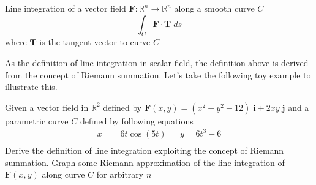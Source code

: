 \documentclass[../../main.tex]{subfiles}
\begin{document}
	
		\begin{definition}\label{def: scalar line integration}
		Line integration of a vector field $\mathbf{F}: \mathbb{R}^n \rightarrow \mathbb{R}^n$ along a smooth curve $C$
		\begin{equation}
			\int_C \mathbf{F} \cdot \mathbf{T} \; ds
		\end{equation}
		where $\mathbf{T}$ is the tangent vector to curve $C$
	\end{definition}
		
	\par As the definition of line integration in scalar field, the definition above is derived from the concept of Riemann summation. Let's take the following toy example to illustrate this.
	
	\begin{example}
		Given a vector field in $\mathbb{R}^2$ defined by $\mathbf{F}(x, y) = (x^2 - y^2 -12) \; \mathbf{i} + 2xy \; \mathbf{j}$ and a parametric curve $C$ defined by following equations 
		\begin{align*}
			x &= 6t \cos(5t)		&&y = 6t^3 - 6\\
		\end{align*}
		Derive the definition of line integration exploiting the concept of Riemann summation. Graph some Riemann approximation of the line integration of $\mathbf{F}(x, y)$ along curve $C$ for arbitrary $n$
	\end{example}
\end{document}
